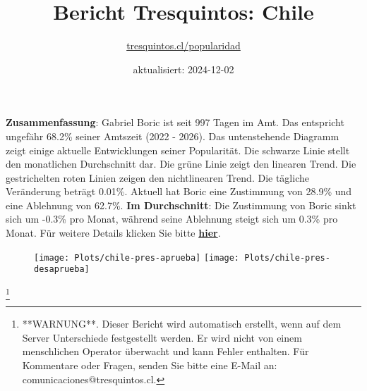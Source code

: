 \documentclass[
]{article}
\title{Bericht Tresquintos: Chile}
\subtitle{\href{https://tresquintos.cl}{tresquintos.cl/popularidad}}
\author{}
\date{\vspace{-2.5em}aktualisiert: 2024-12-02}
\begin{document}
\maketitle

\addtolength{\headheight}{1.0cm} 
\pagestyle{fancy} 
\renewcommand{\headrulewidth}{0pt}

\textbf{Zusammenfassung}: Gabriel Boric ist seit 997 Tagen im Amt. Das
entspricht ungefähr 68.2\% seiner Amtszeit (2022 - 2026). Das
untenstehende Diagramm zeigt einige aktuelle Entwicklungen seiner
Popularität. Die schwarze Linie stellt den monatlichen Durchschnitt dar.
Die grüne Linie zeigt den linearen Trend. Die gestrichelten roten Linien
zeigen den nichtlinearen Trend. Die tägliche Veränderung beträgt 0.01\%.
Aktuell hat Boric eine Zustimmung von 28.9\% und eine Ablehnung von
62.7\%. \textbf{Im Durchschnitt}: Die Zustimmung von Boric sinkt sich um
-0.3\% pro Monat, während seine Ablehnung steigt sich um 0.3\% pro
Monat. Für weitere Details klicken Sie bitte
\href{https://tresquintos.cl/popularidad}{\textbf{hier}}.

\begin{figure}

{\centering \texttt{[image: Plots/chile-pres-aprueba]} \texttt{[image: Plots/chile-pres-desaprueba]} 

}

\end{figure}

\let\thefootnote\relax

\footnote{**WARNUNG**. Dieser Bericht wird automatisch erstellt, wenn auf dem Server Unterschiede festgestellt werden. Er wird nicht von einem menschlichen Operator überwacht und kann Fehler enthalten. Für Kommentare oder Fragen, senden Sie bitte eine E-Mail an: comunicaciones@tresquintos.cl.}
\end{document}
